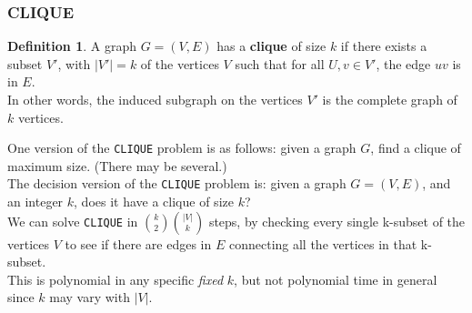 \documentclass[12pt]{article}
\theoremstyle{plain}
\theoremstyle{definition}
\newtheorem*{defn*}{Definition}
\begin{document}
\subsubsection{CLIQUE}
\begin{defn*}
A graph $G = (V, E)$ has a \textbf{clique} of size $k$ if there exists a subset $V'$, with $|V'| = k$ of the vertices $V$ such that for all $U, v \in V'$, the edge $uv$ is in $E$. \\
In other words, the induced subgraph on the vertices $V'$ is the complete graph of $k$ vertices.
\end{defn*}

One version of the \texttt{CLIQUE} problem is as follows: given a graph $G$, find a clique of maximum size. (There may be several.) \\

The decision version of the \texttt{CLIQUE} problem is: given a graph $G = (V, E)$, and an integer $k$, does it have a clique of size $k$? \\

We can solve \texttt{CLIQUE} in ${k \choose 2}{|V| \choose k}$ steps, by checking every single k-subset of the vertices $V$ to see if there are edges in $E$ connecting all the vertices in that k-subset. \\
This is polynomial in any specific \emph{fixed} $k$, but not polynomial time in general since $k$ may vary with $|V|$.
\end{document}
